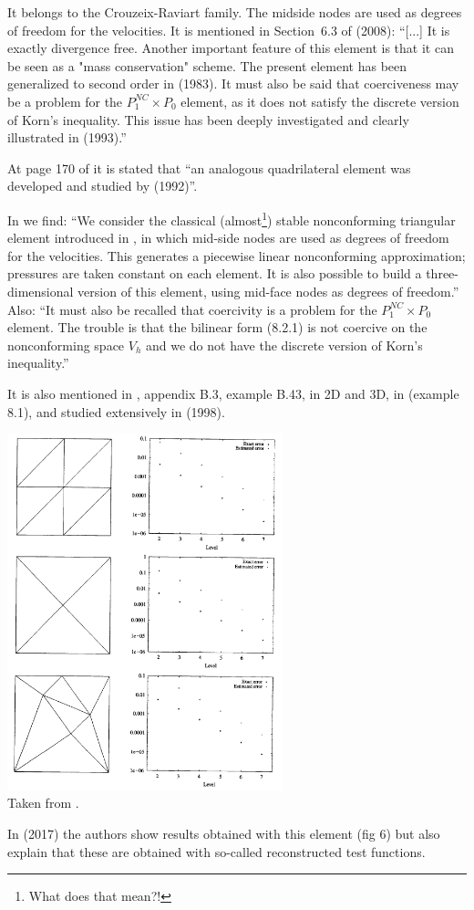 


It belongs to the Crouzeix-Raviart family. 
The midside nodes are used as degrees of freedom for the velocities.
It is mentioned in Section~6.3 of \textcite{bobf08} (2008): ``[...]
It is exactly divergence free. Another important feature of this
element is that it can be seen as a "mass conservation" scheme. The present element
has been generalized to second order in \textcite{foso83} (1983).
It must also be said that coerciveness may be a problem for the $P_1^{NC} \times P_0$ 
element, as it does not satisfy the discrete version of Korn's inequality. 
This issue has been deeply investigated and clearly illustrated in \textcite{arno93} (1993).''



At page 170 of \cite{braess} it is stated that ``an analogous quadrilateral element was 
developed and studied by \textcite{ratu92} (1992)''.

In \textcite{bobf13} we find: ``We consider the classical (almost\footnote{What does that mean?!}) 
stable nonconforming triangular 
element introduced in \textcite{crra73}, in which mid-side nodes are used as degrees of 
freedom for the velocities. This generates
a piecewise linear nonconforming approximation; pressures are taken constant on
each element. It is also possible to build a three-dimensional
version of this element, using mid-face nodes as degrees of freedom.''
Also: ``It must also be recalled that coercivity is a problem for the $P_1^{NC}\times P_0$ 
element. The trouble is that the bilinear form (8.2.1) is not coercive on the 
nonconforming space $V_h$ and we do not have the discrete version of Korn's inequality.''

It is also mentioned in \textcite{john16}, appendix B.3, example B.43, in 2D and 3D, 
in \textcite{brfo} (example 8.1), and studied extensively in \textcite{john98} (1998). 

\begin{center}
\includegraphics[width=8cm]{images/pair_p1ncp0/john98}\\
{\captionfont Taken from \textcite{john98}.}
\end{center}

In \textcite{jolm17} (2017) the authors show results obtained with this element (fig 6) 
but also explain that these are obtained with so-called reconstructed test functions.
 
